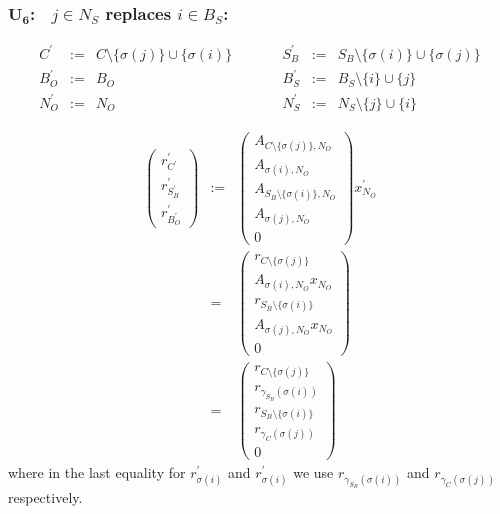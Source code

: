 \documentclass[a4paper]{article}
\begin{document}
\subsubsection{$\mathbf{U_{6}}$:$\quad j \in N_{S}$ replaces $i \in B_{S}$:}
\begin{equation}
\label{update:s_rep_s}
\begin{array}{ccccccc}
C^{\prime}      &:=&  C \setminus \{\sigma(j)\} \cup \{\sigma(i)\}
&\quad\quad&
S_{B}^{\prime}  &:=&  S_{B} \setminus \{\sigma(i)\} \cup \{\sigma(j)\} \\
B_{O}^{\prime}  &:=&  B_{O}
&\quad\quad&
B_{S}^{\prime}  &:=&  B_{S} \setminus \{i\} \cup \{j\}  \\
N_{O}^{\prime}  &:=&  N_{O}
&\quad\quad&
N_{S}^{\prime}  &:=&  N_{S} \setminus \{j\} \cup \{i\} 
\end{array}
\end{equation}

\begin{eqnarray}
\left(
\begin{array}{c}
r_{C^{\prime}}^{\prime} \\
\hline
r_{S_{B}^{\prime}}^{\prime} \\
\hline
r_{B_{O}^{\prime}}^{\prime}
\end{array}
\right)
&:=&
\left(
\begin{array}{c}
A_{C \setminus \{\sigma(j)\}, N_{O}} \\
\hline
A_{\sigma(i), N_{O}} \\
\hline
A_{S_{B} \setminus \{\sigma(i)\}, N_{O}} \\
\hline
A_{\sigma(j), N_{O}} \\
\hline
0
\end{array}
\right)
x_{N_{O}}^{\prime}
\nonumber \\
&=&
\left(
\begin{array}{c}
r_{C \setminus \{\sigma(j)\}} \\
\hline
A_{\sigma(i), N_{O}}x_{N_{O}} \\
\hline
r_{S_{B} \setminus \{\sigma(i)\}} \\
\hline
A_{\sigma(j), N_{O}}x_{N_{O}} \\
\hline
0
\end{array}
\right)
\nonumber \\
&=&
\left(
\begin{array}{c}
r_{C \setminus \{\sigma(j)\}} \\
\hline
r_{\gamma_{S_{B}}(\sigma(i))} \\
\hline
r_{S_{B} \setminus \{\sigma(i)\}} \\
\hline
r_{\gamma_{C}(\sigma(j))} \\
\hline
0
\end{array}
\right)
\end{eqnarray}
where in the last equality for $r_{\sigma(i)}^{\prime}$ and
$r_{\sigma(i)}^{\prime}$ we use $r_{\gamma_{S_{B}}(\sigma(i))}$ and
$r_{\gamma_{C}(\sigma(j))}$ respectively.
\end{document}
